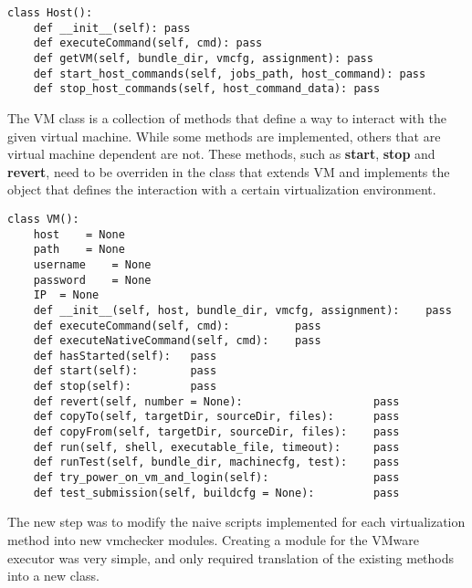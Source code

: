 \lstset{caption=Generic Host Implementation, language=python, label=lst:generic-host}
\begin{lstlisting}
class Host():
    def __init__(self): pass
    def executeCommand(self, cmd): pass
    def getVM(self, bundle_dir, vmcfg, assignment): pass
    def start_host_commands(self, jobs_path, host_command): pass
    def stop_host_commands(self, host_command_data): pass
\end{lstlisting}


The VM class is a collection of methods that define a way to interact with the
given virtual machine. While some methods are implemented, others that are
virtual machine dependent are not. These methods, such as \textbf{start}, 
\textbf{stop} and \textbf{revert}, need to be overriden in the 
class that extends VM and implements the object that defines the interaction
with a certain virtualization environment.

\begin{center}
\end{center}


\lstset{caption=Generic VM Implementation, language=python, label=lst:generic-vm}
\begin{lstlisting}
class VM():
    host 	= None
    path 	= None
    username	= None
    password	= None
    IP	= None
    def __init__(self, host, bundle_dir, vmcfg, assignment):    pass
    def executeCommand(self, cmd):          pass
    def executeNativeCommand(self, cmd):    pass
    def hasStarted(self):   pass
    def start(self):        pass
    def stop(self):         pass
    def revert(self, number = None):                    pass
    def copyTo(self, targetDir, sourceDir, files):      pass
    def copyFrom(self, targetDir, sourceDir, files):    pass
    def run(self, shell, executable_file, timeout):     pass
    def runTest(self, bundle_dir, machinecfg, test):    pass
    def try_power_on_vm_and_login(self):                pass
    def test_submission(self, buildcfg = None):         pass
\end{lstlisting}


The new step was to modify the naive scripts implemented for each virtualization
method into new vmchecker modules. Creating a module for the VMware executor
was very simple, and only required translation of the existing methods into a new
class.



